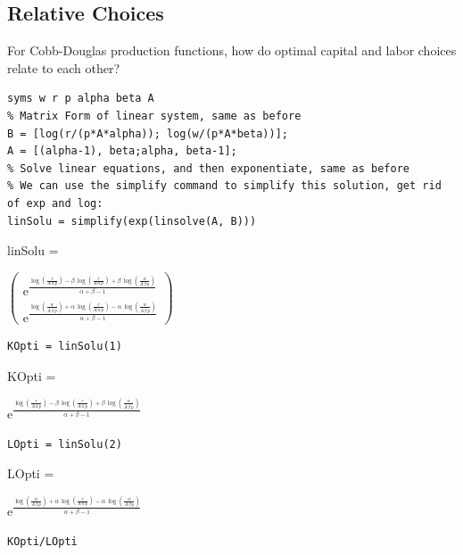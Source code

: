 \documentclass[
]{book}
\begin{document}
\hypertarget{relative-choices}{%
\subsection{Relative Choices}\label{relative-choices}}

For Cobb-Douglas production functions, how do optimal capital and labor
choices relate to each other?

\begin{verbatim}
syms w r p alpha beta A 
% Matrix Form of linear system, same as before
B = [log(r/(p*A*alpha)); log(w/(p*A*beta))];
A = [(alpha-1), beta;alpha, beta-1];
% Solve linear equations, and then exponentiate, same as before
% We can use the simplify command to simplify this solution, get rid of exp and log:
linSolu = simplify(exp(linsolve(A, B)))
\end{verbatim}

linSolu =

\(\displaystyle \left(\begin{array}{c} {\mathrm{e}}^{\frac{\log \left(\frac{r}{A\,\alpha \,p}\right)-\beta \,\log \left(\frac{r}{A\,\alpha \,p}\right)+\beta \,\log \left(\frac{w}{A\,\beta \,p}\right)}{\alpha +\beta -1}} \\ {\mathrm{e}}^{\frac{\log \left(\frac{w}{A\,\beta \,p}\right)+\alpha \,\log \left(\frac{r}{A\,\alpha \,p}\right)-\alpha \,\log \left(\frac{w}{A\,\beta \,p}\right)}{\alpha +\beta -1}} \end{array}\right)\)

\begin{verbatim}
KOpti = linSolu(1)
\end{verbatim}

KOpti =

\(\displaystyle {\mathrm{e}}^{\frac{\log \left(\frac{r}{A\,\alpha \,p}\right)-\beta \,\log \left(\frac{r}{A\,\alpha \,p}\right)+\beta \,\log \left(\frac{w}{A\,\beta \,p}\right)}{\alpha +\beta -1}}\)

\begin{verbatim}
LOpti = linSolu(2)
\end{verbatim}

LOpti =

\(\displaystyle {\mathrm{e}}^{\frac{\log \left(\frac{w}{A\,\beta \,p}\right)+\alpha \,\log \left(\frac{r}{A\,\alpha \,p}\right)-\alpha \,\log \left(\frac{w}{A\,\beta \,p}\right)}{\alpha +\beta -1}}\)

\begin{verbatim}
KOpti/LOpti
\end{verbatim}
\end{document}
